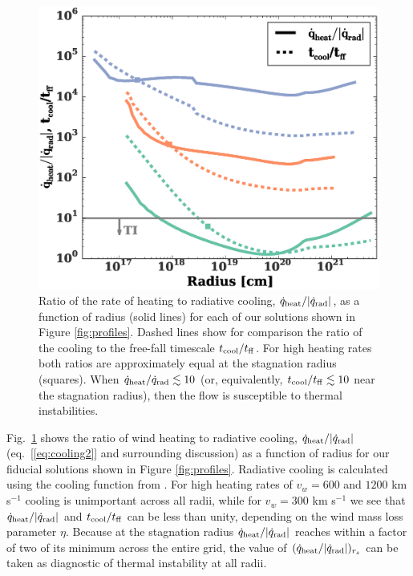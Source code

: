 \documentclass[usenatbib,fleqn]{mn2e}
\newcommand{\tcool}{t_{\rm cool}}
\newcommand{\tff}{t_{\rm ff}}
\begin{document}
\begin{figure}
  \includegraphics[width=\columnwidth]{cooling.eps}
  \caption{\label{fig:cooling} Ratio of the rate of heating to
radiative cooling, $\dot{q}_{\rm heat}/|\dot{q}_{\rm rad}|$, as a
function of radius (solid lines) for each of our solutions shown in
Figure \ref{fig:profiles}.  Dashed lines show for comparison the ratio
of the cooling to the free-fall timescale $t_{\rm cool}/t_{\rm ff}$.
For high heating rates both ratios are approximately equal at the
stagnation radius (squares).  When $\dot{q}_{\rm
heat}/\dot{q}_{\rm rad} \lesssim 10$ (or, equivalently, $t_{\rm cool}/t_{\rm ff}
\lesssim 10$ near the stagnation radius), then the flow is susceptible to thermal instabilities.}
\end{figure}


Fig.~\ref{fig:cooling} shows the ratio of wind heating to radiative
cooling, $\dot{q}_{\rm heat}/|\dot{q}_{\rm rad}|$
(eq.~[\ref{eq:cooling2}] and surrounding discussion) as a function of
radius for our fiducial solutions shown in Figure \ref{fig:profiles}.
Radiative cooling is calculated using the cooling function from
\citealt{Draine:2011a}.  For high heating rates of $v_{w} = 600$ and
$1200$ km s$^{-1}$ cooling is unimportant across all radii, while for
$v_{w} = 300$ km s$^{-1}$ we see that $\dot{q}_{\rm
  heat}/|\dot{q}_{\rm rad}|$ and $\tcool/\tff$ can be less than unity,
depending on the wind mass loss parameter $\eta$.  Because at the
stagnation radius $\dot{q}_{\rm heat}/|\dot{q}_{\rm rad}|$ reaches
within a factor of two of its minimum across the entire grid, the
value of $(\dot{q}_{\rm heat}/|\dot{q}_{\rm rad}|)_{r_{s}}$ can be
taken as diagnostic of thermal instability at all radii.
\end{document}
